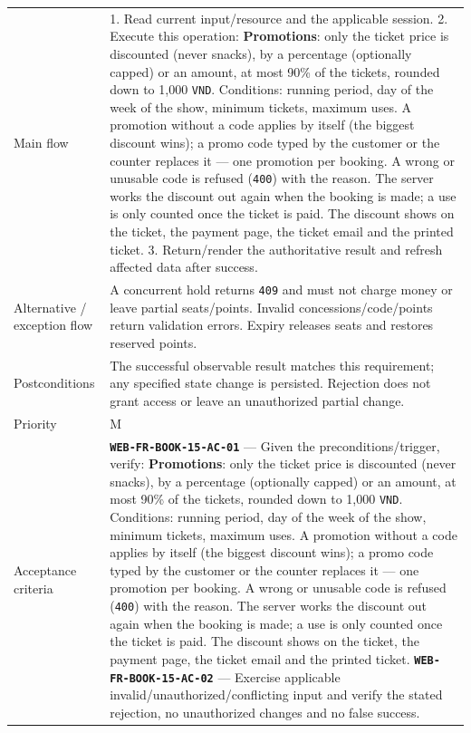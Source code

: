 \begin{longtable}{@{}P{0.23000\SRSWidth}P{0.77000\SRSWidth}@{}}
Main flow & 1. Read current input/\allowbreak{}resource and the applicable session. 2. Execute this operation: \textbf{Promotions}: only the ticket price is discounted (never snacks), by a percentage (optionally capped) or an amount, at most 90\% of the tickets, rounded down to 1,000 \texttt{VND}. Conditions: running period, day of the week of the show, minimum tickets, maximum uses. A promotion without a code applies by itself (the biggest discount wins); a promo code typed by the customer or the counter replaces it — one promotion per booking. A wrong or unusable code is refused (\texttt{400}) with the reason. The server works the discount out again when the booking is made; a use is only counted once the ticket is paid. The discount shows on the ticket, the payment page, the ticket email and the printed ticket. 3. Return/\allowbreak{}render the authoritative result and refresh affected data after success. \\[3pt]
Alternative /\allowbreak{} exception flow & A concurrent hold returns \texttt{409} and must not charge money or leave partial seats/\allowbreak{}points. Invalid concessions/\allowbreak{}code/\allowbreak{}points return validation errors. Expiry releases seats and restores reserved points. \\[3pt]
Postconditions & The successful observable result matches this requirement; any specified state change is persisted. Rejection does not grant access or leave an unauthorized partial change. \\[3pt]
Priority & M \\[3pt]
Acceptance criteria & \textbf{\texttt{WEB-\allowbreak{}FR-\allowbreak{}BOOK-\allowbreak{}15-\allowbreak{}AC-\allowbreak{}01}} — Given the preconditions/\allowbreak{}trigger, verify: \textbf{Promotions}: only the ticket price is discounted (never snacks), by a percentage (optionally capped) or an amount, at most 90\% of the tickets, rounded down to 1,000 \texttt{VND}. Conditions: running period, day of the week of the show, minimum tickets, maximum uses. A promotion without a code applies by itself (the biggest discount wins); a promo code typed by the customer or the counter replaces it — one promotion per booking. A wrong or unusable code is refused (\texttt{400}) with the reason. The server works the discount out again when the booking is made; a use is only counted once the ticket is paid. The discount shows on the ticket, the payment page, the ticket email and the printed ticket. \textbf{\texttt{WEB-\allowbreak{}FR-\allowbreak{}BOOK-\allowbreak{}15-\allowbreak{}AC-\allowbreak{}02}} — Exercise applicable invalid/\allowbreak{}unauthorized/\allowbreak{}conflicting input and verify the stated rejection, no unauthorized changes and no false success. \\[3pt]

\end{longtable}
